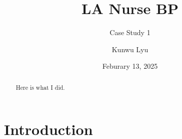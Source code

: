 \documentclass[12pt,twoside,leqno,fleqn,letterpaper]{article}
\title{\textbf{LA Nurse BP}}
\subtitle{Case Study 1} %
\author{Kunwu Lyu}
\date{Feburary 13, 2025}
\theoremstyle{definition}
\theoremstyle{definition}
\newcommand{\detailtexcount}[1]{ %
\immediate\write18{texcount -merge -sum #1.tex > #1.wcdetail }%
%
}
\begin{document}
\renewcommand{\abstractname}{Executive Summary}
\maketitle{\vspace{-6ex}}
\setlength{\parskip}{0.2cm}
\setlength{\mathindent}{31pt}
\expandafter\def\expandafter\normalsize\expandafter{%
    \normalsize%
    \setlength\abovedisplayskip{0pt}%
    \setlength\belowdisplayskip{0pt}%
    \setlength\abovedisplayshortskip{0pt}%
    \setlength\belowdisplayshortskip{0pt}%
}
\singlespacing

\begin{abstract}
    Here is what I did.
\end{abstract}

\section{Introduction}



\singlespacing
% 
% 
\printbibliography
\end{document}

